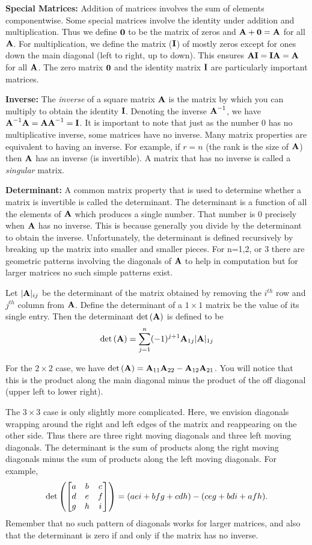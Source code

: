 \medskip
\noindent
{\bf Special Matrices:} 
Addition of matrices involves the sum of elements componentwise.
Some special matrices involve the identity under addition and multiplication.
Thus we define ${\textbf{0}}$ to be the matrix of zeros and ${\textbf{A}}+{\textbf{0}}={\textbf{A}}$ for all ${\textbf{A}}$.
For multiplication, we define the matrix (${\textbf{I}}$) of mostly zeros except for ones down
the main diagonal (left to right, up to down). This ensures ${\textbf{A}}{\textbf{I}}={\textbf{I}}{\textbf{A}}={\textbf{A}}$ for all ${\textbf{A}}$.
The zero matrix ${\textbf{0}}$ and the identity matrix ${\textbf{I}}$ are particularly important matrices.

\medskip
\noindent
{\bf Inverse:}
The \emph{inverse} of a square matrix ${\textbf{A}}$ is the matrix by which you can multiply to
obtain the identity ${\textbf{I}}$.  Denoting the inverse ${\textbf{A}}^{-1}$, we have ${\textbf{A}}^{-1}{\textbf{A}}={\textbf{A}}{\textbf{A}}^{-1}={\textbf{I}}$.
It is important to note that just as the number $0$ has no multiplicative inverse, 
some matrices have no inverse.  Many matrix properties are equivalent to having an inverse.
For example, if $r=n$ (the rank is the size of ${\textbf{A}}$) then ${\textbf{A}}$ has an inverse (is invertible).
A matrix that has no inverse is called a \emph{singular} matrix.

\medskip
\noindent
{\bf Determinant:}
A common matrix property that is used to determine whether a matrix is invertible
is called the determinant.  The determinant is a function of all the elements of ${\textbf{A}}$
which produces a single number.  That number is $0$ precisely when ${\textbf{A}}$ has no inverse.
This is because generally you divide by the determinant to obtain the inverse.
Unfortunately, the determinant is defined recursively by breaking up the matrix into smaller
and smaller pieces.  For n=1,2, or 3 there are geometric patterns involving the diagonals 
of ${\textbf{A}}$ to help in computation but for larger matrices no such simple patterns exist.

Let $|{\textbf{A}}|_{ij}$ be the determinant of the matrix obtained by removing 
the $i^{th}$ row and $j^{th}$ column from ${\textbf{A}}$.  Define the determinant of a $1\times 1$
matrix be the value of its single entry.  Then the determinant $\det{\left( {{\textbf{A}}} \right)}$ is defined
to be 
\[
  \det{\left( {{\textbf{A}}} \right)} = \sum_{j=1}^{n} (-1)^{j+1} {\textbf{A}}_{1j}|{\textbf{A}}|_{1j}
\]

For the $2\times 2$ case, we have $\det{\left( {{\textbf{A}}} \right)} = {\textbf{A}}_{11} {\textbf{A}}_{22} - {\textbf{A}}_{12}{\textbf{A}}_{21}$.
You will notice that this is the product along the main diagonal minus the product
of the off diagonal (upper left to lower right).

The $3\times 3$ case is only slightly more complicated.  Here, we envision diagonals
wrapping around the right and left edges of the matrix and reappearing on the other side.
Thus there are three right moving diagonals and three left moving diagonals.  The determinant
is the sum of products along the right moving diagonals minus the sum of products along the 
left moving diagonals.  For example,
\[
  \det{\left( {\begin{bmatrix} a & b & c \\ d & e & f \\ g & h & i \end{bmatrix}} \right)}=
  (aei+bfg+cdh)-(ceg+bdi+afh).
\]
%
Remember that no such pattern of diagonals works for larger matrices, and also that
the determinant is zero if and only if the matrix has no inverse.

